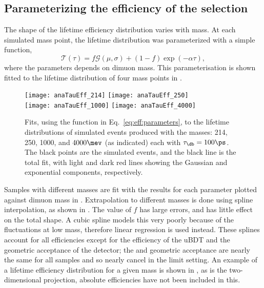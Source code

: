 \subsection{Parameterizing the efficiency of the \db selection}
The shape of the lifetime efficiency distribution varies with mass.
At each simulated mass point, the lifetime distribution was parameterized with a simple function,
\begin{equation}
  \mathcal{T}(\tau) = f\mathcal{G}(\mu, \sigma) + (1-f)\exp\left(-\alpha\tau\right),
  \label{eq:eff:parameters}
\end{equation}
where the parameters depends on dimuon mass.
This parameterisation is shown fitted to the lifetime distribution of four mass points in
.


\begin{figure}
  \begin{center}
    \texttt{[image: anaTauEff\_214]}
    \texttt{[image: anaTauEff\_250]}\\
    \texttt{[image: anaTauEff\_1000]}
    \texttt{[image: anaTauEff\_4000]}
    \caption{\small
      Fits, using the function in Eq.~\protect\ref{eq:eff:parameters},
      to the lifetime distributions of simulated events produced with the masses:
      214, 250, 1000, and $4000\mev$ (as indicated)
      each with $\tau_\db=100\ps$.
      The black points are the simulated events, and the black line is the total fit, with light
      and dark red lines showing the Gaussian and exponential components, respectively.
    }
    \label{fig:eff:fits}
  \end{center}
\end{figure}


Samples with different masses are fit with the results for each parameter plotted against dimuon
mass in .
Extrapolation to different masses is done using spline interpolation, as shown in
.
The value of $f$ has large errors, and has little effect on the total shape.
A cubic spline models this very poorly because of the fluctuations at low mass, therefore linear
regression is used instead.
These splines account for all efficiencies except for the efficiency of the uBDT and the geometric
acceptance of the \lhcb detector; the \uBDT and geometric acceptance are nearly the same for all
samples and so nearly cancel in the limit setting.
An example of a lifetime efficiency distribution for a given mass is shown in ,
as is the two-dimensional projection, absolute efficiencies have not been included in this.

